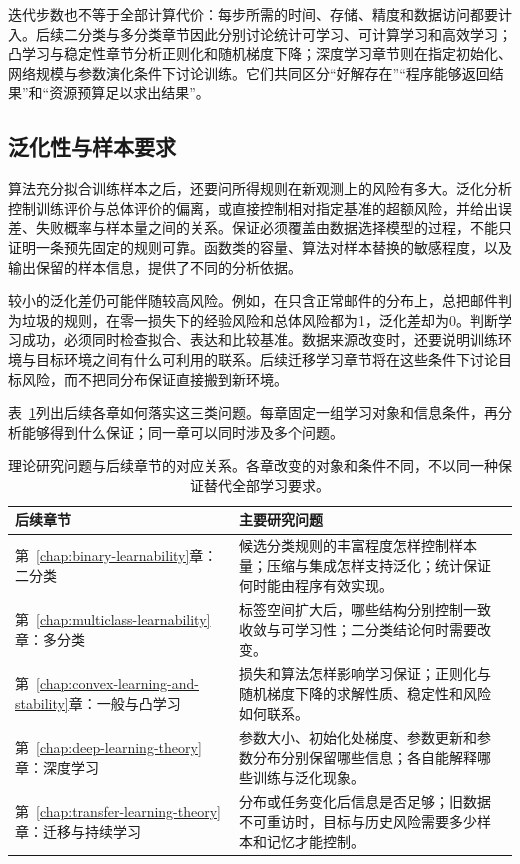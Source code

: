 迭代步数也不等于全部计算代价：每步所需的时间、存储、精度和数据访问都要计入。后续二分类与多分类章节因此分别讨论统计可学习、可计算学习和高效学习；凸学习与稳定性章节分析正则化和随机梯度下降；深度学习章节则在指定初始化、网络规模与参数演化条件下讨论训练。它们共同区分“好解存在”“程序能够返回结果”和“资源预算足以求出结果”。

\subsection{泛化性与样本要求}

算法充分拟合训练样本之后，还要问所得规则在新观测上的风险有多大。泛化分析控制训练评价与总体评价的偏离，或直接控制相对指定基准的超额风险，并给出误差、失败概率与样本量之间的关系。保证必须覆盖由数据选择模型的过程，不能只证明一条预先固定的规则可靠。函数类的容量、算法对样本替换的敏感程度，以及输出保留的样本信息，提供了不同的分析依据。

较小的泛化差仍可能伴随较高风险。例如，在只含正常邮件的分布上，总把邮件判为垃圾的规则，在零一损失下的经验风险和总体风险都为1，泛化差却为0。判断学习成功，必须同时检查拟合、表达和比较基准。数据来源改变时，还要说明训练环境与目标环境之间有什么可利用的联系。后续迁移学习章节将在这些条件下讨论目标风险，而不把同分布保证直接搬到新环境。

表~\ref{tab:learning-theory-chapter-questions}列出后续各章如何落实这三类问题。每章固定一组学习对象和信息条件，再分析能够得到什么保证；同一章可以同时涉及多个问题。

\begin{table}[htbp]
  \centering
  \small
  \begin{tabularx}{\linewidth}{@{}lX@{}}
    \toprule
    \textbf{后续章节} & \textbf{主要研究问题} \\
    \midrule
    第~\ref{chap:binary-learnability}章：二分类 & 候选分类规则的丰富程度怎样控制样本量；压缩与集成怎样支持泛化；统计保证何时能由程序有效实现。 \\
    第~\ref{chap:multiclass-learnability}章：多分类 & 标签空间扩大后，哪些结构分别控制一致收敛与可学习性；二分类结论何时需要改变。 \\
    第~\ref{chap:convex-learning-and-stability}章：一般与凸学习 & 损失和算法怎样影响学习保证；正则化与随机梯度下降的求解性质、稳定性和风险如何联系。 \\
    第~\ref{chap:deep-learning-theory}章：深度学习 & 参数大小、初始化处梯度、参数更新和参数分布分别保留哪些信息；各自能解释哪些训练与泛化现象。 \\
    第~\ref{chap:transfer-learning-theory}章：迁移与持续学习 & 分布或任务变化后信息是否足够；旧数据不可重访时，目标与历史风险需要多少样本和记忆才能控制。 \\
    \bottomrule
  \end{tabularx}
  \caption{理论研究问题与后续章节的对应关系。各章改变的对象和条件不同，不以同一种保证替代全部学习要求。}
  \label{tab:learning-theory-chapter-questions}
\end{table}

